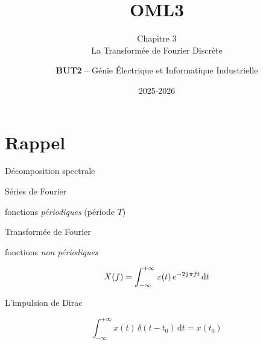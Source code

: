 \documentclass[aspectratio=43,10pt]{beamer}
\title{OML3}
\subtitle{Chapitre 3 \\ La Transformée de Fourier Discrète}
\author{\textbf{BUT2} -- Génie Électrique et Informatique Industrielle}
\date{2025-2026}
\newcommand{\highlight}[1]{{\color{niceblue}\emph{#1}}}
\newcommand{\slidefig}[2]{%
\begin{center}
\resizebox{#1}{!}{}
\end{center}
}
\begin{document}
\maketitle

\section{Rappel}

\begin{frame}{Décomposition spectrale}
    \slidefig{0.65\textwidth}{decompose-porte-fourier.tex}
\end{frame}

\begin{frame}{}
    \slidefig{\textwidth}{rappel-graph.tex}
    \vspace{1em}
\end{frame}

\begin{frame}{Séries de Fourier}
    \begin{center}
        \small fonctions \highlight{périodiques} (période $T$)
    \end{center}
    \vspace{0.8em}
    \begin{center}
    \end{center}
\end{frame}

\begin{frame}{Transformée de Fourier}
    \begin{center}
        \small fonctions \highlight{non périodiques}
    \end{center}
    \vspace{0.8em}
    \begin{center}
        \Large
        $$X(f) = \int_{-\infty}^{+\infty} x(t)\,e^{-2\operatorname{\mathsf{j}}\pi ft}\,\mathrm dt$$
    \end{center}
\end{frame}

\begin{frame}{L'impulsion de Dirac}
    \slidefig{0.55\textwidth}{dirac-sifting.tex}
    \begin{center}
        $$\int_{-\infty}^{+\infty} x(t)\,\delta(t-t_0)\,\mathrm dt = x(t_0)$$
    \end{center}
\end{frame}
\end{document}
